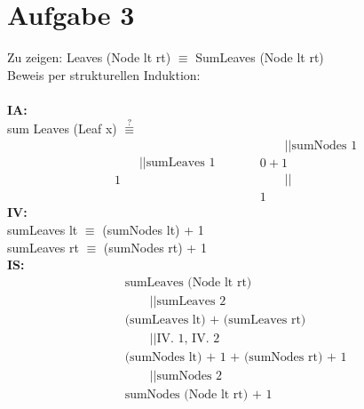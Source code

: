 \documentclass[11]{article}
\begin{document}
\section*{Aufgabe 3}
Zu zeigen: Leaves (Node lt rt) $\equiv$ SumLeaves (Node lt rt) \\
Beweis per strukturellen Induktion: \\ \\
\textbf{IA: } \\
sum Leaves (Leaf x) $\stackrel{?}{\equiv}$ 
\begin{equation*}
\begin{aligned}
& \qquad || \text{sumLeaves 1} \\
& 1
\end{aligned}
\qquad
\begin{aligned}
& \qquad ||\text{sumNodes 1} \\
& 0 + 1 \\
& \qquad || \\
& 1
\end{aligned}
\end{equation*}
\textbf{IV: } \\
sumLeaves lt $\equiv$ (sumNodes lt) + 1 \\
sumLeaves rt $\equiv$ (sumNodes rt) + 1 \\
\textbf{IS: }
\begin{align*}
& \text{sumLeaves (Node lt rt)} \\
& \qquad ||\text{sumLeaves 2} \\
& \text{(sumLeaves lt) + (sumLeaves rt)} \\
& \qquad || \text{IV. 1, IV. 2} \\
& \text{(sumNodes lt) + 1 + (sumNodes rt) + 1} \\
& \qquad || \text{sumNodes 2} \\
& \text{sumNodes (Node lt rt) + 1}
\end{align*}
\end{document}
